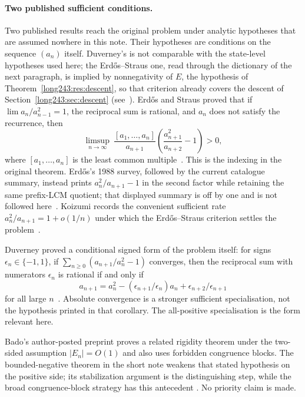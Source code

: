 \documentclass[11pt]{article}
\begin{document}
\paragraph{Two published sufficient conditions.}
Two published results reach the original problem under analytic hypotheses that
are assumed nowhere in this note.  Their hypotheses are conditions on the
sequence $(a_n)$ itself.  Duverney's is not comparable with the state-level
hypotheses used here; the Erd\H{o}s--Straus one, read through the dictionary of
the next paragraph, is implied by nonnegativity of $E$, the hypothesis of
Theorem~\ref{long243:res:descent}, so that criterion already covers the descent of
Section~\ref{long243:sec:descent} (see~\cite[Cor.~4(1) and Prop.~1(1), pp.~14--15]{koizumi2025}).
Erd\H{o}s and Straus proved that if $\lim a_n/a_{n-1}^{2}=1$, the reciprocal
sum is rational, and $a_n$ does not satisfy the recurrence, then
\[
 \limsup_{n\to\infty}\ \frac{[a_1,\ldots,a_n]}{a_{n+1}}
 \left(\frac{a_{n+1}^{2}}{a_{n+2}}-1\right)>0,
\]
where $[a_1,\ldots,a_n]$ is the least common
multiple~\cite[Theorem~3, p.~132]{erdosstraus1964}.  This is the indexing in
the original theorem.  Erd\H{o}s's 1988 survey, followed by the current
catalogue summary, instead prints $a_n^2/a_{n+1}-1$ in the second factor while
retaining the same prefix-LCM quotient; that displayed summary is off by one
and is not followed here~\cite[p.~105]{erdos1988}\cite{erdosproblems}.
Koizumi records the convenient sufficient rate
$a_n^2/a_{n+1}=1+o(1/n)$ under which the Erd\H{o}s--Straus criterion settles
the problem~\cite[Remark~3, p.~16]{koizumi2025}.

Duverney proved a
conditional signed form of the problem itself: for signs
$\epsilon_n\in\{-1,1\}$, if
$\sum_{n\ge0}(a_{n+1}/a_n^{2}-1)$ converges, then the reciprocal sum with
numerators $\epsilon_n$ is rational if and only if
\[
 a_{n+1}=a_n^2-(\epsilon_{n+1}/\epsilon_n)a_n
             +\epsilon_{n+2}/\epsilon_{n+1}
\]
for all large $n$~\cite[Corollary~3.2, p.~287]{duverney2001}.  Absolute
convergence is a stronger sufficient specialisation, not the hypothesis
printed in that corollary.  The all-positive specialisation is the form
relevant here.

Bado's author-posted preprint proves a related rigidity theorem under the
two-sided assumption $|E_n|=O(1)$ and also uses forbidden congruence blocks.
The bounded-negative theorem in the short note weakens that stated hypothesis
on the positive side; its stabilization argument is the distinguishing step,
while the broad congruence-block strategy has this antecedent
\cite[Theorem~5.1]{bado2026}.  No priority claim is made.
\end{document}
